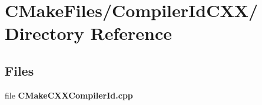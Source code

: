 \section{CMakeFiles/CompilerIdCXX/ Directory Reference}
\label{dir_33ac1e101170a5e81a3648413f8747f3}
\subsection*{Files}
\begin{DoxyCompactItemize}
\item 
file {\bf CMakeCXXCompilerId.cpp}
\end{DoxyCompactItemize}
